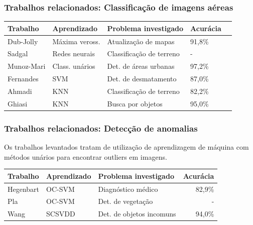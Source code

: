 \documentclass[t]{beamer}
\begin{document}
\begin{frame}[c]
	\frametitle{Trabalhos relacionados: Classificação de imagens aéreas}
	\small{
		\begin{table}[h]
		\centering
		\begin{tabulary}{\linewidth}{|L|L|L|L|C|}
		\hline
		\textbf{Trabalho} &  \textbf{Aprendizado} & \textbf{Problema investigado} &  \textbf{Acurácia} \\ \hline
		Dub-Jolly  & Máxima veross. & Atualização de mapas      & 91,8\%  \\ \hline
		Sadgal     & Redes neurais  & Classificação de terreno  & -       \\ \hline
		Munoz-Mari & Class. unários & Det. de áreas urbanas     & 97,2\%  \\ \hline
		Fernandes  & SVM            & Det. de desmatamento      & 87,0\%  \\ \hline
		Ahmadi     & KNN            & Classificação de terreno  & 82,2\% \\ \hline
		Ghiasi     & KNN            & Busca por objetos         & 95,0\%  \\ \hline
		\end{tabulary}
		\end{table}
	}
\end{frame}


\begin{frame}[c]
	\frametitle{Trabalhos relacionados: Detecção de anomalias}

	\vspace{0.5cm}

	Os trabalhos levantados tratam de utilização de aprendizagem de máquina com métodos unários para encontrar outliers em imagens.
	
	\vspace{0.5cm}

	\small{
		\begin{table}[h]
		\begin{tabulary}{\linewidth}{|L|L|L|R|}
			\hline
			\textbf{Trabalho} & \textbf{Aprendizado} & \textbf{Problema investigado} & \textbf{Acurácia} \\ \hline
			Hegenbart & OC-SVM & Diagnóstico médico       & 82,9\% \\ \hline
			Pla       & OC-SVM & Det. de vegetação        & -      \\ \hline
			Wang      & SCSVDD & Det. de objetos incomuns & 94,0\% \\ \hline
		\end{tabulary}
		\end{table}
	}
\end{frame}
\end{document}
